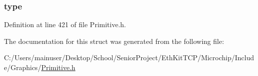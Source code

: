 \subsubsection[{type}]{ type}\label{struct_f_o_n_t___f_l_a_s_h_ad19c8e0d19c638be9dd81d163454b0f1}


Definition at line 421 of file Primitive.\+h.



The documentation for this struct was generated from the following file\+:\begin{DoxyCompactItemize}
\item 
C\+:/\+Users/mainuser/\+Desktop/\+School/\+Senior\+Project/\+Eth\+Kit\+T\+C\+P/\+Microchip/\+Include/\+Graphics/\hyperlink{_primitive_8h}{Primitive.\+h}\end{DoxyCompactItemize}
